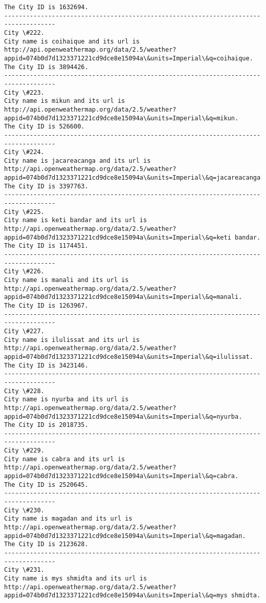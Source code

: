 \documentclass[11pt]{article}
\begin{document}
\begin{Verbatim}[commandchars=\\\{\}]
The City ID is 1632694.
------------------------------------------------------------------------------------
City \#222.
City name is coihaique and its url is http://api.openweathermap.org/data/2.5/weather?appid=074b0d7d1323371221cd9dce8e15094a\&units=Imperial\&q=coihaique.
The City ID is 3894426.
------------------------------------------------------------------------------------
City \#223.
City name is mikun and its url is http://api.openweathermap.org/data/2.5/weather?appid=074b0d7d1323371221cd9dce8e15094a\&units=Imperial\&q=mikun.
The City ID is 526600.
------------------------------------------------------------------------------------
City \#224.
City name is jacareacanga and its url is http://api.openweathermap.org/data/2.5/weather?appid=074b0d7d1323371221cd9dce8e15094a\&units=Imperial\&q=jacareacanga.
The City ID is 3397763.
------------------------------------------------------------------------------------
City \#225.
City name is keti bandar and its url is http://api.openweathermap.org/data/2.5/weather?appid=074b0d7d1323371221cd9dce8e15094a\&units=Imperial\&q=keti bandar.
The City ID is 1174451.
------------------------------------------------------------------------------------
City \#226.
City name is manali and its url is http://api.openweathermap.org/data/2.5/weather?appid=074b0d7d1323371221cd9dce8e15094a\&units=Imperial\&q=manali.
The City ID is 1263967.
------------------------------------------------------------------------------------
City \#227.
City name is ilulissat and its url is http://api.openweathermap.org/data/2.5/weather?appid=074b0d7d1323371221cd9dce8e15094a\&units=Imperial\&q=ilulissat.
The City ID is 3423146.
------------------------------------------------------------------------------------
City \#228.
City name is nyurba and its url is http://api.openweathermap.org/data/2.5/weather?appid=074b0d7d1323371221cd9dce8e15094a\&units=Imperial\&q=nyurba.
The City ID is 2018735.
------------------------------------------------------------------------------------
City \#229.
City name is cabra and its url is http://api.openweathermap.org/data/2.5/weather?appid=074b0d7d1323371221cd9dce8e15094a\&units=Imperial\&q=cabra.
The City ID is 2520645.
------------------------------------------------------------------------------------
City \#230.
City name is magadan and its url is http://api.openweathermap.org/data/2.5/weather?appid=074b0d7d1323371221cd9dce8e15094a\&units=Imperial\&q=magadan.
The City ID is 2123628.
------------------------------------------------------------------------------------
City \#231.
City name is mys shmidta and its url is http://api.openweathermap.org/data/2.5/weather?appid=074b0d7d1323371221cd9dce8e15094a\&units=Imperial\&q=mys shmidta.

\end{Verbatim}
\end{document}
